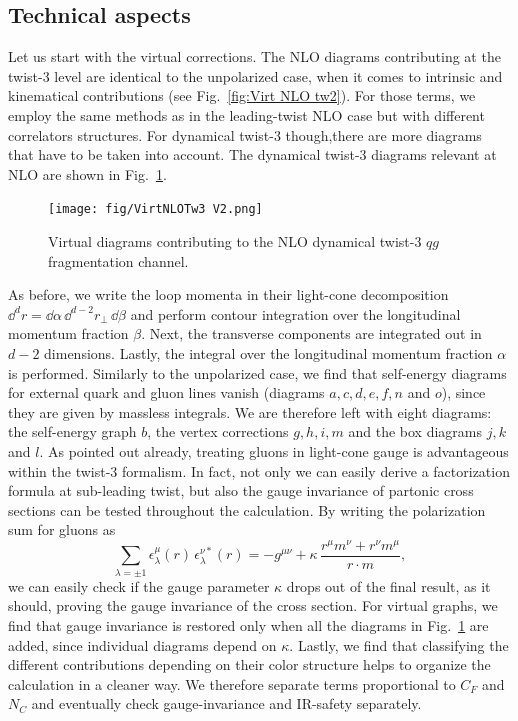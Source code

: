 \subsection{Technical aspects}
Let us start with the virtual corrections. The NLO diagrams contributing at the twist-3 level are identical to the unpolarized case, when it comes to intrinsic and kinematical contributions (see Fig.~\ref{fig:Virt NLO tw2}). For those terms, we employ the same methods as in the leading-twist NLO case but with different correlators structures. For dynamical twist-3 though,there are more diagrams that have to be taken into account. The dynamical twist-3 diagrams relevant at NLO are shown in Fig.~\ref{fig:Virt NLO tw3}.
\begin{figure}[ht]
    \centering
    \texttt{[image: fig/VirtNLOTw3 V2.png]}
    \caption{Virtual diagrams contributing to the NLO dynamical twist-3 $qg$ fragmentation channel.}
    \label{fig:Virt NLO tw3}
    \end{figure}
As before, we write the loop momenta in their light-cone decomposition $\dd ^d r=\dd \alpha\,\dd^{d-2} r_\perp \,\dd \beta$ and perform contour integration over the longitudinal momentum fraction $\beta$. Next, the transverse components are integrated out in $d-2$ dimensions. Lastly, the integral over the longitudinal momentum fraction $\alpha$ is performed. Similarly to the unpolarized case, we find that self-energy diagrams for external quark and gluon lines vanish (diagrams $a,c,d,e,f,n$ and $o$), since they are given by massless integrals. We are therefore left with eight diagrams: the self-energy graph $b$, the vertex corrections $g,h,i,m$ and the box diagrams $j,k$ and $l$. As pointed out already, treating gluons in light-cone gauge is advantageous within the twist-3 formalism. In fact, not only we can easily derive a factorization formula at sub-leading twist, but also the gauge invariance of partonic cross sections can be tested throughout the calculation. By writing the polarization sum for gluons as
\begin{equation}
    \sum_{\lambda=\pm 1} \epsilon_\lambda^\mu(r)\,\epsilon_\lambda^{\nu*}(r)= -g^{\mu\nu}+\kappa\,\frac{r^\mu m^\nu+r^\nu m^\mu}{r \cdot m},
\end{equation}
we can easily check if the gauge parameter $\kappa$ drops out of the final result, as it should, proving the gauge invariance of the cross section. For virtual graphs, we find that gauge invariance is restored only when all the diagrams in Fig.~\ref{fig:Virt NLO tw3} are added, since individual diagrams depend on $\kappa$. Lastly, we find that classifying the different contributions depending on their color structure helps to organize the calculation in a cleaner way. We therefore separate terms proportional to $C_F$ and $N_C$ and eventually check gauge-invariance and IR-safety separately.
 
